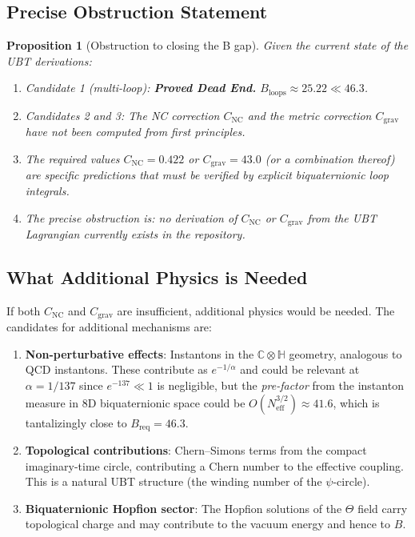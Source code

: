 \documentclass[11pt,a4paper]{article}
\newtheorem{proposition}{Proposition}
\theoremstyle{remark}
\begin{document}
\subsection{Precise Obstruction Statement}

\begin{proposition}[Obstruction to closing the B gap]
\label{prop:obstruction}
Given the current state of the UBT derivations:
\begin{enumerate}
  \item Candidate 1 (multi-loop): \textbf{Proved Dead End.}
    $B_{\mathrm{loops}} \approx 25.22 \ll 46.3$.
  \item Candidates 2 and 3: The NC correction $C_{\mathrm{NC}}$ and the metric correction
    $C_{\mathrm{grav}}$ \emph{have not been computed from first principles}.
  \item The required values $C_{\mathrm{NC}} = 0.422$ or $C_{\mathrm{grav}} = 43.0$ (or
    a combination thereof) are specific predictions that must be verified by explicit
    biquaternionic loop integrals.
  \item The precise obstruction is: \emph{no derivation of $C_{\mathrm{NC}}$ or
    $C_{\mathrm{grav}}$ from the UBT Lagrangian currently exists in the repository.}
\end{enumerate}
\end{proposition}

\subsection{What Additional Physics is Needed}

If both $C_{\mathrm{NC}}$ and $C_{\mathrm{grav}}$ are insufficient, additional physics would be needed. The candidates for additional mechanisms are:

\begin{enumerate}
  \item \textbf{Non-perturbative effects}: Instantons in the $\mathbb{C} \otimes \mathbb{H}$
    geometry, analogous to QCD instantons. These contribute as $e^{-1/\alpha}$ and could be
    relevant at $\alpha = 1/137$ since $e^{-137} \ll 1$ is negligible, but the
    \emph{pre-factor} from the instanton measure in 8D biquaternionic space could be
    $O(N_{\mathrm{eff}}^{3/2}) \approx 41.6$, which is tantalizingly close to $B_{\mathrm{req}} = 46.3$.
  \item \textbf{Topological contributions}: Chern--Simons terms from the compact imaginary-time
    circle, contributing a Chern number to the effective coupling. This is a natural UBT
    structure (the winding number of the $\psi$-circle).
  \item \textbf{Biquaternionic Hopfion sector}: The Hopfion solutions of the $\Theta$ field
    carry topological charge and may contribute to the vacuum energy and hence to $B$.
\end{enumerate}
\end{document}

